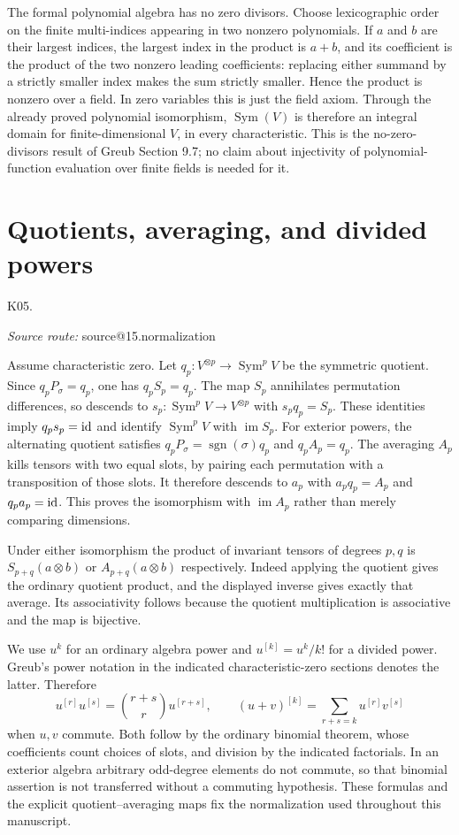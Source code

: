\documentclass[11pt,a4paper]{book}
\makeatletter
\theoremstyle{definition}\newtheorem{definition}[theorem]{Definition}
\theoremstyle{remark}\newtheorem{remark}[theorem]{Remark}
\DeclareMathOperator{\im}{im}\DeclareMathOperator{\rank}{rank}
\DeclareMathOperator{\Sym}{Sym}\DeclareMathOperator{\Ann}{Ann}
\newcommand{\Kentry}[2]{\section{#2}\label{k:#1}\noindent\textsf{\small K05.\detokenize{#1}}\par
  \begingroup\small\color{black!65}\textit{Source route: }\csname source@#1\endcsname\par\endgroup}
\makeatother
\begin{document}
The formal polynomial algebra has no zero divisors. Choose lexicographic order on the finite multi-indices appearing in two nonzero polynomials. If $a$ and $b$ are their largest indices, the largest index in the product is $a+b$, and its coefficient is the product of the two nonzero leading coefficients: replacing either summand by a strictly smaller index makes the sum strictly smaller. Hence the product is nonzero over a field. In zero variables this is just the field axiom. Through the already proved polynomial isomorphism, $\Sym(V)$ is therefore an integral domain for finite-dimensional $V$, in every characteristic. This is the no-zero-divisors result of Greub Section 9.7; no claim about injectivity of polynomial-function evaluation over finite fields is needed for it.

\Kentry{15.normalization}{Quotients, averaging, and divided powers}
Assume characteristic zero. Let $q_p:V^{\otimes p}\to\Sym^pV$ be the symmetric quotient. Since $q_pP_\sigma=q_p$, one has $q_pS_p=q_p$. The map $S_p$ annihilates permutation differences, so descends to $s_p:\Sym^pV\to V^{\otimes p}$ with $s_pq_p=S_p$. These identities imply $q_ps_p=\operatorname{id}$ and identify $\Sym^pV$ with $\im S_p$. For exterior powers, the alternating quotient satisfies $q_pP_\sigma=\operatorname{sgn}(\sigma)q_p$ and $q_pA_p=q_p$. The averaging $A_p$ kills tensors with two equal slots, by pairing each permutation with a transposition of those slots. It therefore descends to $a_p$ with $a_pq_p=A_p$ and $q_pa_p=\operatorname{id}$. This proves the isomorphism with $\im A_p$ rather than merely comparing dimensions.

Under either isomorphism the product of invariant tensors of degrees $p,q$ is $S_{p+q}(a\otimes b)$ or $A_{p+q}(a\otimes b)$ respectively. Indeed applying the quotient gives the ordinary quotient product, and the displayed inverse gives exactly that average. Its associativity follows because the quotient multiplication is associative and the map is bijective.

We use $u^k$ for an ordinary algebra power and $u^{[k]}=u^k/k!$ for a divided power. Greub's power notation in the indicated characteristic-zero sections denotes the latter. Therefore
\[
 u^{[r]}u^{[s]}=\binom{r+s}{r}u^{[r+s]},\qquad
 (u+v)^{[k]}=\sum_{r+s=k}u^{[r]}v^{[s]}
\]
when $u,v$ commute. Both follow by the ordinary binomial theorem, whose coefficients count choices of slots, and division by the indicated factorials. In an exterior algebra arbitrary odd-degree elements do not commute, so that binomial assertion is not transferred without a commuting hypothesis. These formulas and the explicit quotient--averaging maps fix the normalization used throughout this manuscript.
\end{document}
